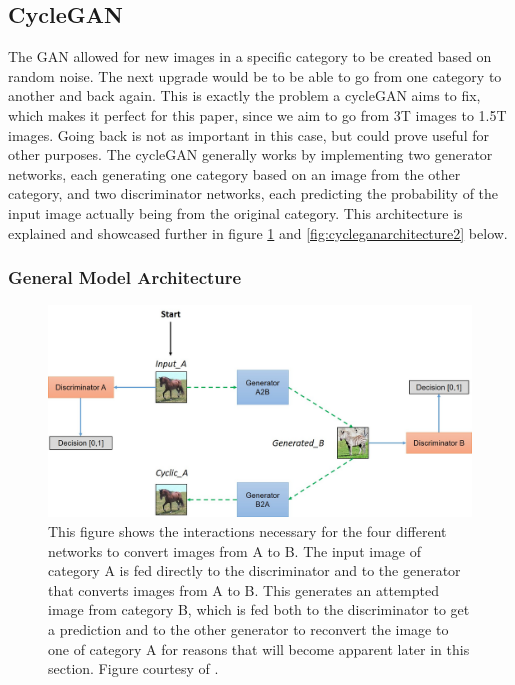 \documentclass[12pt, fleqn, titlepage]{article}
\begin{document}
\subsection{CycleGAN}\label{cyclegan}
The GAN allowed for new images in a specific category to be created based on random noise. The next upgrade would be to be able to go from one category to another and back again. This is exactly the problem a cycleGAN aims to fix, which makes it perfect for this paper, since we aim to go from 3T images to 1.5T images. Going back is not as important in this case, but could prove useful for other purposes. The cycleGAN generally works by implementing two generator networks, each generating one category based on an image from the other category, and two discriminator networks, each predicting the probability of the input image actually being from the original category. This architecture is explained and showcased further in figure \ref{fig:cycleganarchitecture} and \ref{fig:cycleganarchitecture2} below.

\subsubsection{General Model Architecture}
\begin{figure}[H]
	\centering
	\includegraphics[width=0.7\linewidth]{imgs/cyclegan_architecture}
	\caption{This figure shows the interactions necessary for the four different networks to convert images from A to B. The input image of category A is fed directly to the discriminator and to the generator that converts images from A to B. This generates an attempted image from category B, which is fed both to the discriminator to get a prediction and to the other generator to reconvert the image to one of category A for reasons that will become apparent later in this section. Figure courtesy of \cite{model_architecture}.}
	\label{fig:cycleganarchitecture}
\end{figure}
\end{document}
